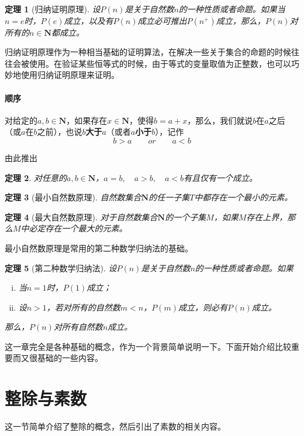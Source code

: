 \documentclass{ctexrep}
\newcommand{\bbold}[1]{\textbf{#1}}
\newcommand{\N}{\boldsymbol{N}}
\newtheorem{thrm}{定理}[section]
\begin{document}
\begin{thrm}[归纳证明原理]
设$P(n)$是关于自然数$n$的一种性质或者命题。如果当$n=e$时，$P(e)$成立，以及有$P(n)$成立必可推出$P(n^+)$成立，那么，$P(n)$对所有的$n \in \N$都成立。
\end{thrm}

归纳证明原理作为一种相当基础的证明算法，在解决一些关于集合的命题的时候往往会被使用。在验证某些恒等式的时候，由于等式的变量取值为正整数，也可以巧妙地使用归纳证明原理来证明。

\paragraph{顺序}
对给定的$a,b \in \N$，如果存在$x \in \N$，使得$b=a+x$，那么，我们就说$b$在$a$之后（或$a$在$b$之前），也说$b$\bbold{大于}$a$（或者$a$\bbold{小于}$b$），记作
\begin{displaymath}
b > a \qquad or \qquad a<b
\end{displaymath}

由此推出
\begin{thrm}
对任意的$a,b \in \N$，$a=b,\quad a>b,\quad a<b$有且仅有一个成立。
\end{thrm}

\begin{thrm}[最小自然数原理]
自然数集合$\N$的任一子集$T$中都存在一个最小的元素。
\end{thrm}

\begin{thrm}[最大自然数原理]
对于自然数集合$\N$的一个子集$M$，如果$M$存在上界，那么$M$中必定存在一个最大的元素。
\end{thrm}

最小自然数原理是常用的第二种数学归纳法的基础。
\begin{thrm}[第二种数学归纳法]
设$P(n)$是关于自然数$n$的一种性质或者命题。如果
\begin{enumerate}[(i)]
\item 当$n=1$时，$P(1)$成立；
\item 设$n>1$，若对所有的自然数$m<n$，$P(m)$成立，则必有$P(n)$成立。
\end{enumerate}
那么，$P(n)$对所有自然数$n$成立。
\end{thrm}

这一章完全是各种基础的概念，作为一个背景简单说明一下。下面开始介绍比较重要而又很基础的一些内容。

\section{整除与素数}
这一节简单介绍了整除的概念，然后引出了素数的相关内容。
\end{document}
